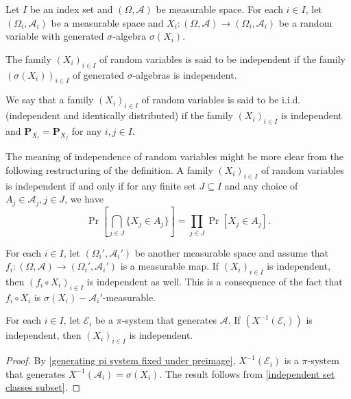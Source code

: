Let $I$ be an index set and $(\Omega,\mathcal{A})$ be measurable space. For each $i\in I$, let $(\Omega_i,\mathcal{A}_i)$ be a measurable space and $X_i:(\Omega,\mathcal{A})\to(\Omega_i,\mathcal{A}_i)$ be a random variable with generated $\sigma$-algebra $\sigma(X_i)$.

\begin{definition}
    The family $(X_i)_{i\in I}$ of random variables is said to be independent if the family $(\sigma(X_i))_{i\in I}$ of generated $\sigma$-algebras is independent.
\end{definition}

We say that a family $(X_i)_{i\in I}$ of random variables is said to be i.i.d. (independent and identically distributed) if the family $(X_i)_{i\in I}$ is independent and $\textbf{P}_{X_i}=\textbf{P}_{X_j}$ for any $i,j\in I$.

\vspace{2mm}
The meaning of independence of random variables might be more clear from the following restructuring of the definition. A family $(X_i)_{i\in I}$ of random variables is independent if and only if for any finite set $J\subseteq I$ and any choice of $A_j\in\mathcal{A}_j,j\in J$, we have
$$\Pr\left[\bigcap_{j\in J}\{X_j\in A_j\}\right] = \prod_{j\in J}\Pr[X_j\in A_j].$$

For each $i\in I$, let $(\Omega_i',\mathcal{A}_i')$ be another measurable space and assume that $f_i:(\Omega,\mathcal{A})\to(\Omega_i',\mathcal{A}_i')$ is a measurable map. If $(X_i)_{i\in I}$ is independent, then $(f_i\circ X_i)_{i\in I}$ is independent as well. This is a consequence of the fact that $f_i\circ X_i$ is $\sigma(X_i)-\mathcal{A}_i'$-measurable.

\begin{theorem}
\label{independent if generators independent}
    For each $i\in I$, let $\mathcal{E}_i$ be a $\pi$-system that generates $\mathcal{A}$. If $(X^{-1}(\mathcal{E}_i))$ is independent, then $(X_i)_{i\in I}$ is independent.
\end{theorem}
\begin{proof}
    By \ref{generating pi system fixed under preimage}, $X^{-1}(\mathcal{E}_i)$ is a $\pi$-system that generates $X^{-1}(\mathcal{A}_i)=\sigma(X_i)$. The result follows from \ref{independent set classes subset}.
\end{proof}


